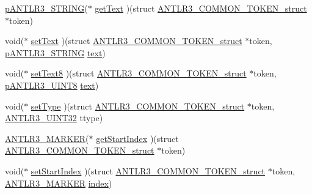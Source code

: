 \begin{DoxyCompactItemize}
\begin{tabbing}
\end{tabbing}\item 
\hyperlink{antlr3interfaces_8h_a36bbe7362079348864db4b4dbdcce56b}{p\-A\-N\-T\-L\-R3\-\_\-\-S\-T\-R\-I\-N\-G}($\ast$ \hyperlink{struct_a_n_t_l_r3___c_o_m_m_o_n___t_o_k_e_n__struct_a8b903dff51ace5fc2af285d9a9828e28}{get\-Text} )(struct \hyperlink{struct_a_n_t_l_r3___c_o_m_m_o_n___t_o_k_e_n__struct}{A\-N\-T\-L\-R3\-\_\-\-C\-O\-M\-M\-O\-N\-\_\-\-T\-O\-K\-E\-N\-\_\-struct} $\ast$token)
\item 
void($\ast$ \hyperlink{struct_a_n_t_l_r3___c_o_m_m_o_n___t_o_k_e_n__struct_ac13a711cff156a2a0a0f44aeb8b1537c}{set\-Text} )(struct \hyperlink{struct_a_n_t_l_r3___c_o_m_m_o_n___t_o_k_e_n__struct}{A\-N\-T\-L\-R3\-\_\-\-C\-O\-M\-M\-O\-N\-\_\-\-T\-O\-K\-E\-N\-\_\-struct} $\ast$token, \hyperlink{antlr3interfaces_8h_a36bbe7362079348864db4b4dbdcce56b}{p\-A\-N\-T\-L\-R3\-\_\-\-S\-T\-R\-I\-N\-G} \hyperlink{struct_a_n_t_l_r3___c_o_m_m_o_n___t_o_k_e_n__struct_acf3ae47f1cd3cdd62174e8617bcee521}{text})
\item 
void($\ast$ \hyperlink{struct_a_n_t_l_r3___c_o_m_m_o_n___t_o_k_e_n__struct_a80b182f3520f42844ecc2ecbfaae7c1a}{set\-Text8} )(struct \hyperlink{struct_a_n_t_l_r3___c_o_m_m_o_n___t_o_k_e_n__struct}{A\-N\-T\-L\-R3\-\_\-\-C\-O\-M\-M\-O\-N\-\_\-\-T\-O\-K\-E\-N\-\_\-struct} $\ast$token, \hyperlink{antlr3defs_8h_a95c800abcac5d607fd9e3e775ace78c5}{p\-A\-N\-T\-L\-R3\-\_\-\-U\-I\-N\-T8} \hyperlink{struct_a_n_t_l_r3___c_o_m_m_o_n___t_o_k_e_n__struct_acf3ae47f1cd3cdd62174e8617bcee521}{text})
\item 
void($\ast$ \hyperlink{struct_a_n_t_l_r3___c_o_m_m_o_n___t_o_k_e_n__struct_a589c65c971df84b86e2455f41f925338}{set\-Type} )(struct \hyperlink{struct_a_n_t_l_r3___c_o_m_m_o_n___t_o_k_e_n__struct}{A\-N\-T\-L\-R3\-\_\-\-C\-O\-M\-M\-O\-N\-\_\-\-T\-O\-K\-E\-N\-\_\-struct} $\ast$token, \hyperlink{antlr3defs_8h_ac41f744abd0fd25144b9eb9d11b1dfd1}{A\-N\-T\-L\-R3\-\_\-\-U\-I\-N\-T32} ttype)
\item 
\hyperlink{antlr3defs_8h_a0361e6bf442e07afe923e4d05e9ebc4f}{A\-N\-T\-L\-R3\-\_\-\-M\-A\-R\-K\-E\-R}($\ast$ \hyperlink{struct_a_n_t_l_r3___c_o_m_m_o_n___t_o_k_e_n__struct_aa41d51a857a617266a6aad2108f363a6}{get\-Start\-Index} )(struct \hyperlink{struct_a_n_t_l_r3___c_o_m_m_o_n___t_o_k_e_n__struct}{A\-N\-T\-L\-R3\-\_\-\-C\-O\-M\-M\-O\-N\-\_\-\-T\-O\-K\-E\-N\-\_\-struct} $\ast$token)
\item 
void($\ast$ \hyperlink{struct_a_n_t_l_r3___c_o_m_m_o_n___t_o_k_e_n__struct_a768d81d983b00d15fb177bbf4b0e52a0}{set\-Start\-Index} )(struct \hyperlink{struct_a_n_t_l_r3___c_o_m_m_o_n___t_o_k_e_n__struct}{A\-N\-T\-L\-R3\-\_\-\-C\-O\-M\-M\-O\-N\-\_\-\-T\-O\-K\-E\-N\-\_\-struct} $\ast$token, \hyperlink{antlr3defs_8h_a0361e6bf442e07afe923e4d05e9ebc4f}{A\-N\-T\-L\-R3\-\_\-\-M\-A\-R\-K\-E\-R} \hyperlink{struct_a_n_t_l_r3___c_o_m_m_o_n___t_o_k_e_n__struct_aa4e14f542df2d0c11835264d7bd8afe3}{index})

\end{DoxyCompactItemize}
